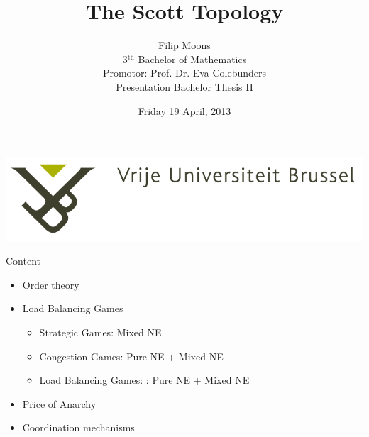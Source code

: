 \documentclass{beamer}
\title{The Scott Topology}
\author{Filip Moons\\3$^{\text{th}}$ Bachelor of Mathematics\\Promotor: Prof. Dr. Eva Colebunders\\Presentation Bachelor Thesis II}
\date{Friday 19 April, 2013}
\begin{document}
\begin{frame}[plain]
\includegraphics[width=0.4\paperwidth]{VUB_logo.jpg}
\vspace{2cm}
\titlepage
\end{frame}



%
%
%
%

\begin{frame}{Content}
\begin{itemize}
  \item Order theory
  \item Load Balancing Games
    \begin{itemize}
    \item Strategic Games: Mixed NE
    \item Congestion Games: Pure NE + Mixed NE
    \item Load Balancing Games: : Pure NE + Mixed NE
    \end{itemize}
  \item Price of Anarchy
  \item Coordination mechanisms
\end{itemize}

\end{frame}
\end{document}
